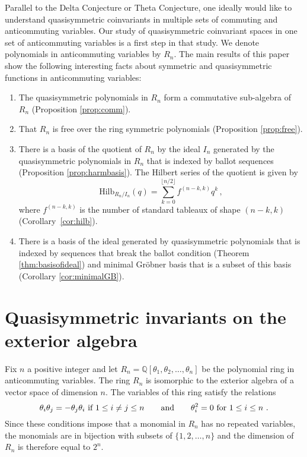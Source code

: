 \documentclass[11pt,oneside]{amsart}
\theoremstyle{definition}
\numberwithin{equation}{section}
\begin{document}
Parallel to the Delta Conjecture or Theta Conjecture, one ideally would like to understand quasisymmetric coinvariants in multiple sets of commuting and anticommuting variables.  Our study of quasisymmetric coinvariant spaces in one set of anticommuting variables is a first step in that study.  We denote polynomials in anticommuting variables by $R_n$. The main results of this paper show the following interesting facts about symmetric and quasisymmetric functions in anticommuting variables:
\begin{enumerate}
\item The quasisymmetric polynomials in $R_n$ form a commutative sub-algebra of $R_n$
(Proposition \ref{prop:comm}).
\item That $R_n$ is free over the ring symmetric polynomials (Proposition \ref{prop:free}).
\item There is a basis of the quotient of $R_n$ by the ideal $I_n$ generated by the
quasisymmetric polynomials in $R_n$ that is indexed by ballot sequences (Proposition \ref{prop:harmbasis}).
The Hilbert series of the quotient is given by
 $$ \text{Hilb}_{R_n/I_n}(q) = \sum_{k=0}^{\lfloor{n/2}\rfloor} f^{(n-k,k)} q^k\,,$$
 where $f^{(n-k,k)}$ is the  number  of standard tableaux of shape $(n-k,k)$ (Corollary~\ref{cor:hilb}).
\item There is a basis of the ideal generated by quasisymmetric polynomials
that is indexed by sequences that break the ballot condition
(Theorem \ref{thm:basisofideal}) and minimal Gr\"obner basis
that is a subset of this basis (Corollary \ref{cor:minimalGB}).
\end{enumerate}



\section{Quasisymmetric invariants on the exterior algebra}

Fix $n$ a positive integer and
let $R_n = {\mathbb Q}[\theta_1, \theta_2, \ldots, \theta_n]$ be the
polynomial ring in anticommuting variables.
The ring $R_n$ is isomorphic to the exterior algebra of a vector
space of dimension $n$.  The variables of this ring satisfy the relations
\[
\theta_i \theta_j = - \theta_j \theta_i \hbox{ if } 1 \leq i \neq j \leq n
\qquad\hbox{and}\qquad \theta_i^2 = 0 \hbox{ for }1 \leq i \leq n~.
\]
Since these conditions impose that a monomial in $R_n$ has no repeated variables,
the monomials are in bijection with subsets of $\{1,2,\ldots, n\}$
and the dimension of $R_n$ is therefore equal to $2^n$.
\end{document}
